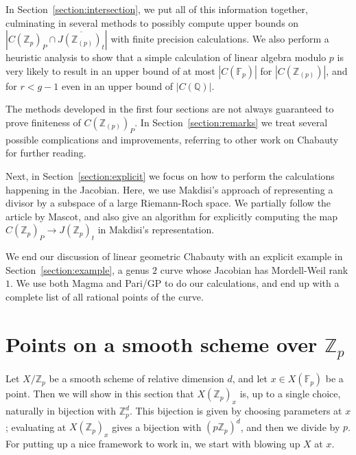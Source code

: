\documentclass[12pt]{article}
\newcommand{\Z}{\mathbb{Z}}
\newcommand{\Q}{\mathbb{Q}}
\newcommand{\F}{\mathbb{F}}
\theoremstyle{plain}
\theoremstyle{definition}
\theoremstyle{remark}
\begin{document}
In Section~\ref{section:intersection}, we put all of this information together, culminating in several methods to possibly compute upper bounds on $\left|C(\Z_p)_P \cap \overline{J(\Z_{(p)})_t}\right|$ with finite precision calculations. We also perform a heuristic analysis to show that a simple calculation of linear algebra modulo $p$ is very likely to result in an upper bound of at most $|C(\F_p)|$ for $|C(\Z_{(p)})|$, and for $r < g-1$ even in an upper bound of $|C(\Q)|$.

The methods developed in the first four sections are not always guaranteed to prove finiteness of $C(\Z_{(p)})_P$. In Section~\ref{section:remarks} we treat several possible complications and improvements, referring to other work on Chabauty for further reading.

Next, in Section~\ref{section:explicit} we focus on how to perform the calculations happening in the Jacobian. Here, we use Makdisi's approach of representing a divisor by a subspace of a large Riemann-Roch space. We partially follow the article \cite{mascot18} by Mascot, and also give an algorithm for explicitly computing the map $C(\Z_p)_P \to J(\Z_p)_t$ in Makdisi's representation.

We end our discussion of linear geometric Chabauty with an explicit example in Section~\ref{section:example}, a genus $2$ curve whose Jacobian has Mordell-Weil rank $1$. We use both Magma and Pari/GP to do our calculations, and end up with a complete list of all rational points of the curve.

\newpage
\section{Points on a smooth scheme over \texorpdfstring{$\Z_p$}{Z\_p}}
\label{section:smoothzppoints}
Let $X/\Z_p$ be a smooth scheme of relative dimension $d$, and let $x \in X(\F_p)$ be a point. Then we will show in this section that $X(\Z_p)_x$ is, up to a single choice, naturally in bijection with $\Z_p^d$. This bijection is given by choosing parameters at $x$; evaluating at $X(\Z_p)_x$ gives a bijection with $(p\Z_p)^d$, and then we divide by $p$. For putting up a nice framework to work in, we start with blowing up $X$ at $x$.
\end{document}
